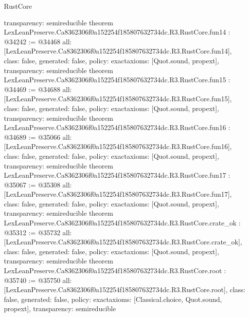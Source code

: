 \begin{lexlean}{RustCore}
\begin{coremodule}
{  transparency: semireducible
}
theorem LexLeanPreserve.Ca8362306f0a152254f185807632734dc.R3.RustCore.fun14 : @34242 := @34468 {
  all: [LexLeanPreserve.Ca8362306f0a152254f185807632734dc.R3.RustCore.fun14],
  class: false,
  generated: false,
  policy: exact{axioms: [Quot.sound, propext]},
  transparency: semireducible
}
theorem LexLeanPreserve.Ca8362306f0a152254f185807632734dc.R3.RustCore.fun15 : @34469 := @34688 {
  all: [LexLeanPreserve.Ca8362306f0a152254f185807632734dc.R3.RustCore.fun15],
  class: false,
  generated: false,
  policy: exact{axioms: [Quot.sound, propext]},
  transparency: semireducible
}
theorem LexLeanPreserve.Ca8362306f0a152254f185807632734dc.R3.RustCore.fun16 : @34689 := @35066 {
  all: [LexLeanPreserve.Ca8362306f0a152254f185807632734dc.R3.RustCore.fun16],
  class: false,
  generated: false,
  policy: exact{axioms: [Quot.sound, propext]},
  transparency: semireducible
}
theorem LexLeanPreserve.Ca8362306f0a152254f185807632734dc.R3.RustCore.fun17 : @35067 := @35308 {
  all: [LexLeanPreserve.Ca8362306f0a152254f185807632734dc.R3.RustCore.fun17],
  class: false,
  generated: false,
  policy: exact{axioms: [Quot.sound, propext]},
  transparency: semireducible
}
theorem LexLeanPreserve.Ca8362306f0a152254f185807632734dc.R3.RustCore.crate_ok : @35312 := @35732 {
  all: [LexLeanPreserve.Ca8362306f0a152254f185807632734dc.R3.RustCore.crate_ok],
  class: false,
  generated: false,
  policy: exact{axioms: [Quot.sound, propext]},
  transparency: semireducible
}
theorem LexLeanPreserve.Ca8362306f0a152254f185807632734dc.R3.RustCore.root : @35740 := @35750 {
  all: [LexLeanPreserve.Ca8362306f0a152254f185807632734dc.R3.RustCore.root],
  class: false,
  generated: false,
  policy: exact{axioms: [Classical.choice, Quot.sound, propext]},
  transparency: semireducible
}


\end{coremodule}
\end{lexlean}
